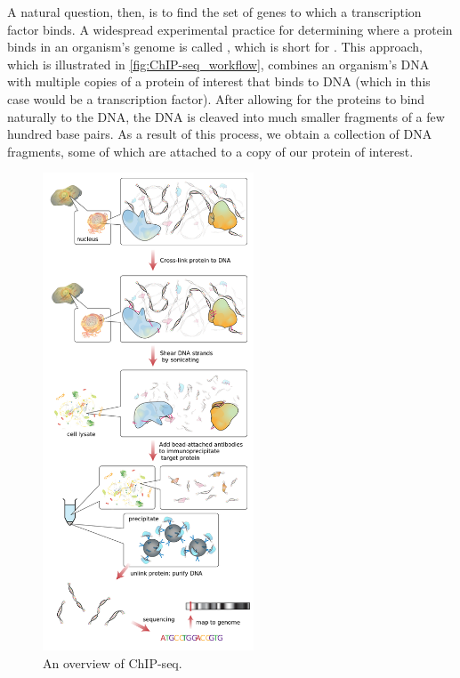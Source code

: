\begin{note}\end{note}

A natural question, then, is to find the set of genes to which a transcription factor binds. A widespread experimental practice for determining where a protein binds in an organism's genome is called , which is short for . This approach, which is illustrated in \autoref{fig:ChIP-seq_workflow}, combines an organism's DNA with multiple copies of a protein of interest that binds to DNA (which in this case would be a transcription factor). After allowing for the proteins to bind naturally to the DNA, the DNA is cleaved into much smaller fragments of a few hundred base pairs. As a result of this process, we obtain a collection of DNA fragments, some of which are attached to a copy of our protein of interest.

\begin{figure}[hp]
\centering
\mySfFamily
\includegraphics[width = 0.56\textwidth]{../images/ChIP-seq_workflow.png}
\caption{An overview of ChIP-seq.}
\label{fig:ChIP-seq_workflow}
\end{figure}

